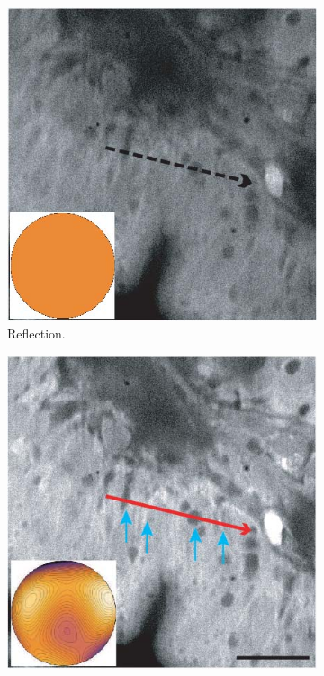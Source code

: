 \begin{figure}[tbh]
        \centering
        \begin{subfigure}[b]{0.3\textwidth}
                \includegraphics[width=\textwidth]{images/structured_illumination_uncorrected}
                \caption{Reflection.}
                \label{fig:SI_uncorrected}
        \end{subfigure}
        \begin{subfigure}[b]{0.3\textwidth}
                \includegraphics[width=\textwidth]{images/structured_illumination_corrected}

\end{subfigure}
\end{figure}
